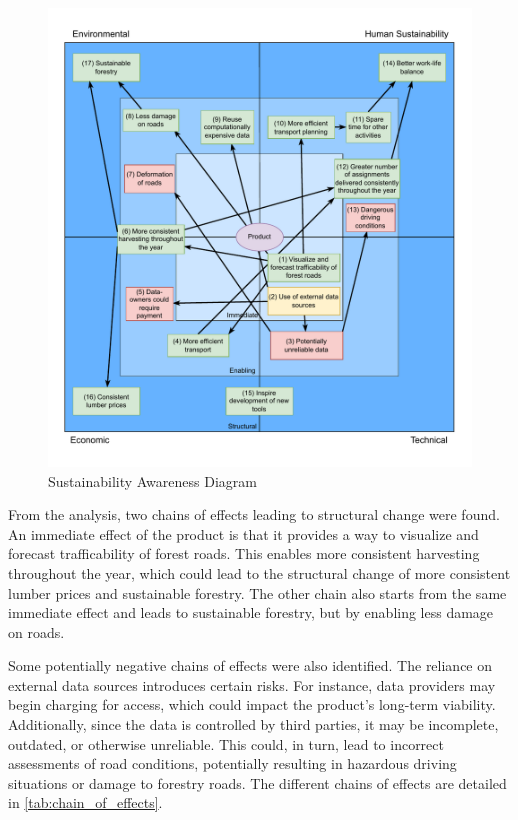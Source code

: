 \begin{figure}[h]
    \centering
    \includegraphics[width=0.8\linewidth]{figures/susaf.pdf}
    \caption{Sustainability Awareness Diagram}
    \label{fig:susafdiagram}
\end{figure}

From the analysis, two chains of effects leading to structural change were found. An immediate effect of the product is that it provides a way to visualize and forecast trafficability of forest roads. This enables more consistent harvesting throughout the year, which could lead to the structural change of more consistent lumber prices and sustainable forestry. The other chain also starts from the same immediate effect and leads to sustainable forestry, but by enabling less damage on roads.

Some potentially negative chains of effects were also identified. The reliance on external data sources introduces certain risks. For instance, data providers may begin charging for access, which could impact the product's long-term viability. Additionally, since the data is controlled by third parties, it may be incomplete, outdated, or otherwise unreliable. This could, in turn, lead to incorrect assessments of road conditions, potentially resulting in hazardous driving situations or damage to forestry roads. The different chains of effects are detailed in \autoref{tab:chain_of_effects}.

